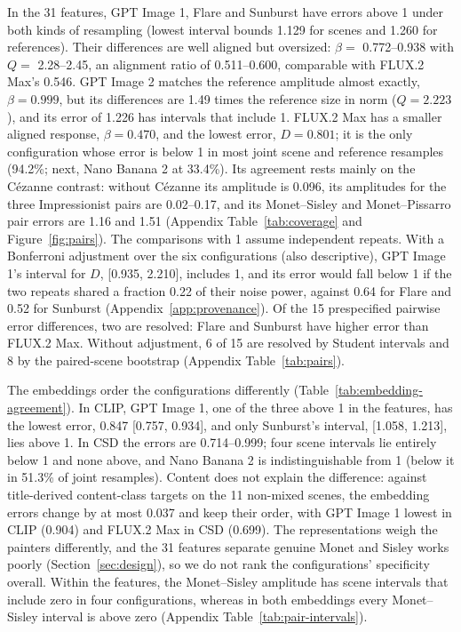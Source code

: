 \documentclass[10pt]{article}
\begin{document}
In the 31 features, GPT Image 1, Flare and Sunburst have errors above 1 under both kinds of
resampling (lowest interval bounds 1.129 for scenes and 1.260 for references). Their differences
are well aligned but oversized: $\beta=$ 0.772--0.938 with $Q=$ 2.28--2.45, an alignment ratio of
0.511--0.600, comparable with FLUX.2 Max's 0.546. GPT Image 2 matches the reference amplitude almost
exactly, $\beta=0.999$, but its differences are 1.49 times the reference size in norm ($Q=2.223$),
and its error of 1.226 has intervals that include 1. FLUX.2 Max has a smaller aligned response,
$\beta=0.470$, and the lowest error, $D=0.801$; it is the only configuration whose error is below 1
in most joint scene and reference resamples (94.2\%; next, Nano Banana 2 at 33.4\%). Its agreement
rests mainly on the C\'ezanne contrast: without C\'ezanne its amplitude is 0.096, its amplitudes for
the three Impressionist pairs are 0.02--0.17, and its Monet--Sisley and Monet--Pissarro pair errors
are 1.16 and 1.51 (Appendix Table~\ref{tab:coverage} and Figure~\ref{fig:pairs}). The comparisons
with 1 assume independent repeats. With a Bonferroni adjustment over the six configurations (also
descriptive), GPT Image 1's interval for $D$, [0.935, 2.210], includes 1, and its error would fall
below 1 if the two repeats shared a fraction 0.22 of their noise power, against 0.64 for Flare and
0.52 for Sunburst (Appendix~\ref{app:provenance}). Of the 15 prespecified pairwise error
differences, two are resolved: Flare and Sunburst have higher error than FLUX.2 Max. Without
adjustment, 6 of 15 are resolved by Student intervals and 8 by the paired-scene bootstrap
(Appendix Table~\ref{tab:pairs}).



The embeddings order the configurations differently (Table~\ref{tab:embedding-agreement}). In CLIP,
GPT Image 1, one of the three above 1 in the features, has the lowest error, 0.847 [0.757, 0.934],
and only Sunburst's interval, [1.058, 1.213], lies above 1. In CSD the errors are 0.714--0.999; four
scene intervals lie entirely below 1 and none above, and Nano Banana 2 is indistinguishable from 1
(below it in 51.3\% of joint resamples). Content does not explain the difference: against
title-derived content-class targets on the 11 non-mixed scenes, the embedding errors change by at
most 0.037 and keep their order, with GPT Image 1 lowest in CLIP (0.904) and FLUX.2 Max in CSD
(0.699). The representations weigh the painters differently, and the 31 features separate genuine
Monet and Sisley works poorly (Section~\ref{sec:design}), so we do not rank the configurations'
specificity overall. Within the features, the Monet--Sisley amplitude has scene intervals that
include zero in four configurations, whereas in both embeddings every Monet--Sisley interval is
above zero (Appendix Table~\ref{tab:pair-intervals}).
\end{document}
